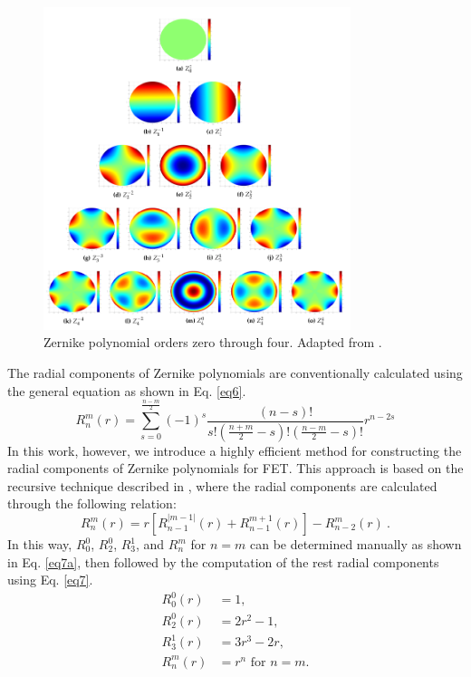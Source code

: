 \begin{figure}
    \centering
    \includegraphics[width=0.8\textwidth]{figs/zernike.png}
    \caption[Zernike polynomial orders zero through four]{Zernike polynomial orders zero through four. Adapted from \cite{ellis}.}
    \label{fig_21}
\end{figure}

The radial components of Zernike polynomials are conventionally calculated using the general equation as shown in Eq. \ref{eq6}.
\begin{equation}
R_n^m(r) = \sum_{s=0}^{\frac{n-m}{2}} (-1)^s \frac{(n-s)!}{s! \left( \frac{n+m}{2} - s \right)! \left( \frac{n-m}{2} - s \right)!} r^{n-2s}
\label{eq6}
\end{equation}
In this work, however, we introduce a highly efficient method for constructing the radial components of Zernike polynomials for FET. This approach is based on the recursive technique described in \cite{honarvar}, where the radial components are calculated through the following relation:
\begin{equation}
    R_n^m\left(r\right)=r\left[R_{n-1}^{\left|m-1\right|}\left(r\right)+R_{n-1}^{m+1}\left(r\right)\right]-R_{n-2}^m\left(r\right)\ .
    \label{eq7}
\end{equation}
In this way, $R_0^0$, $R_2^0$, $R_3^1$, and $R_n^m$ for $n=m$ can be determined manually as shown in Eq. \ref{eq7a}, then followed by the computation of the rest radial components using Eq. \ref{eq7}.
\begin{equation}
    \begin{split}
    R_0^0(r) &= 1, \\
    R_2^0(r) &= 2r^2-1, \\
    R_3^1(r) &= 3r^3-2r, \\
    R_n^m(r) &= r^n \text{ for } n = m.
    \end{split}
    \label{eq7a}
\end{equation}

